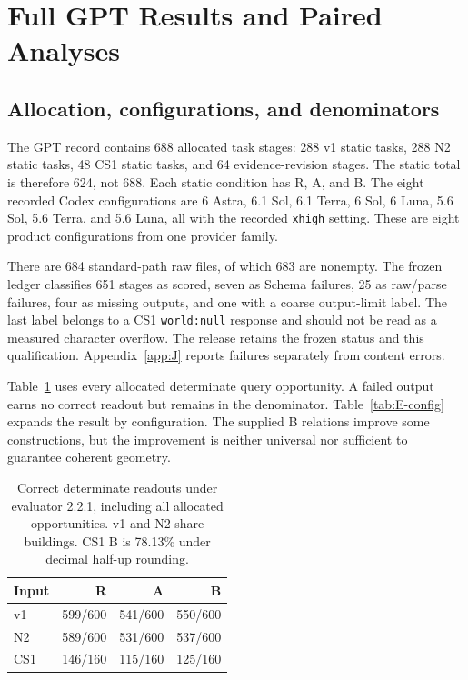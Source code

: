 \section{Full GPT Results and Paired Analyses}\label{app:E}
\subsection{Allocation, configurations, and denominators}
The GPT record contains 688 allocated task stages: 288 v1 static tasks, 288 N2 static tasks, 48 CS1 static tasks, and 64 evidence-revision stages. The static total is therefore 624, not 688. Each static condition has R, A, and B. The eight recorded Codex configurations are 6 Astra, 6.1 Sol, 6.1 Terra, 6 Sol, 6 Luna, 5.6 Sol, 5.6 Terra, and 5.6 Luna, all with the recorded \texttt{xhigh} setting. These are eight product configurations from one provider family.

There are 684 standard-path raw files, of which 683 are nonempty. The frozen ledger classifies 651 stages as scored, seven as Schema failures, 25 as raw/parse failures, four as missing outputs, and one with a coarse output-limit label. The last label belongs to a CS1 \texttt{world:null} response and should not be read as a measured character overflow. The release retains the frozen status and this qualification. Appendix~\ref{app:J} reports failures separately from content errors.

Table~\ref{tab:E-main} uses every allocated determinate query opportunity. A failed output earns no correct readout but remains in the denominator. Table~\ref{tab:E-config} expands the result by configuration. The supplied B relations improve some constructions, but the improvement is neither universal nor sufficient to guarantee coherent geometry.

\begin{table}[htbp]\centering
\begin{tabular}{lrrr}\toprule Input & R & A & B\\\midrule
v1 & 599/600 & 541/600 & 550/600\\
N2 & 589/600 & 531/600 & 537/600\\
CS1 & 146/160 & 115/160 & 125/160\\\bottomrule
\end{tabular}
\caption{Correct determinate readouts under evaluator 2.2.1, including all allocated opportunities. v1 and N2 share buildings. CS1 B is 78.13\% under decimal half-up rounding.}\label{tab:E-main}
\end{table}

